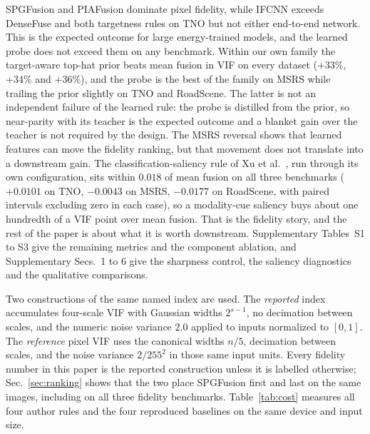 \documentclass[preprint,10pt]{elsarticle}
\begin{document}
\begin{sloppypar}
SPGFusion and PIAFusion dominate pixel fidelity, while IFCNN exceeds DenseFuse and both
targetness rules on TNO but not either end-to-end network. This is the expected
outcome for large energy-trained models, and the learned probe does not exceed them on
any benchmark. Within our own family the target-aware top-hat prior beats mean fusion in VIF
on every dataset ($+33\%$, $+34\%$ and $+36\%$), and the probe is the best of the
family on MSRS while trailing the prior slightly on TNO and RoadScene. The latter is not
an independent failure of the learned rule: the probe is distilled from the prior, so
near-parity with its teacher is the expected outcome and a blanket gain over the teacher
is not required by the design. The MSRS reversal shows that learned features can move
the fidelity ranking, but that movement does not translate into a downstream gain. The
classification-saliency rule of Xu et al.~\cite{xu2021}, run through its own
configuration, sits within $0.018$ of mean fusion on all three benchmarks
($+0.0101$ on TNO, $-0.0043$ on MSRS, $-0.0177$ on RoadScene, with paired intervals
excluding zero in each case), so a modality-cue saliency buys about one hundredth of a
VIF point over mean fusion. That is the fidelity story, and the rest of the paper is
about what it is worth downstream. Supplementary Tables~S1 to S3 give the remaining
metrics and the component ablation, and Supplementary Secs.~1 to 6
give the sharpness control, the saliency diagnostics and the qualitative comparisons.

Two constructions of the same named index are used. The \emph{reported} index
accumulates four-scale VIF with Gaussian widths $2^{s-1}$, no decimation between scales,
and the numeric noise variance $2.0$ applied to inputs normalized to $[0,1]$. The
\emph{reference} pixel VIF uses the canonical widths $n/5$, decimation between scales,
and the noise variance $2/255^2$ in those same input units. Every fidelity number in
this paper is the reported construction unless it is labelled otherwise;
Sec.~\ref{sec:ranking} shows that the two place SPGFusion first and last on the same
images, including on all three fidelity benchmarks. Table~\ref{tab:cost} measures all
four author rules and the four reproduced baselines on the same device and input size.

\begin{table}[!t]\centering\small


\end{table}
\end{sloppypar}
\end{document}
